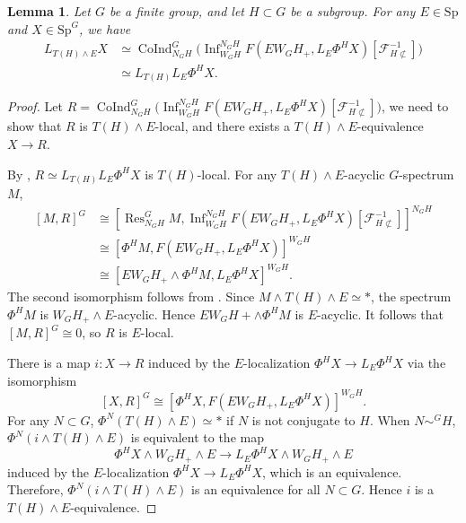 \documentclass{amsart}
\theoremstyle{plain}
\newtheorem{lemma}[theorem]{Lemma}
\theoremstyle{definition}
\theoremstyle{remark}
\begin{document}
\begin{lemma}\label{lem:morava k local}
    Let $G$ be a finite group, and let $H\subset G$ be a subgroup. For any $E\in \mathrm{Sp}$ and $X\in \mathrm{Sp}^G$, we have
    \[
    \begin{aligned}
        L_{T(H)\wedge E}X  & \simeq \operatorname{CoInd}_{N_GH}^G\bigl( \operatorname{Inf}_{W_G H}^{N_G H} F(EW_G H_+, L_{E}\Phi^H X)[\mathcal{F}_{H\not\subset}^{-1}] \bigr)\\
        & \simeq L_{T(H)}L_{E}\Phi^H X.
    \end{aligned}
    \]
\end{lemma}
\begin{proof}
    Let $R=\operatorname{CoInd}_{N_GH}^G\bigl( \operatorname{Inf}_{W_G H}^{N_G H} F(EW_G H_+, L_{E}\Phi^H X)[\mathcal{F}_{H\not\subset}^{-1}] \bigr)$, we need to show that $R$ is $T(H)\wedge E$-local, and there exists a $T(H)\wedge E$-equivalence $X\to R$. 

    By , $R\simeq L_{T(H)}L_{E}\Phi^H X$ is $T(H)$-local. For any $T(H)\wedge E$-acyclic $G$-spectrum $M$, 
    \[
    \begin{aligned}
        [M, R]^G &\cong [\operatorname{Res}_{N_G H}^G M, \operatorname{Inf}_{W_G H}^{N_G H} F(EW_G H_+, L_{E}\Phi^H X)[\mathcal{F}_{H\not\subset}^{-1}]]^{N_GH}\\
        & \cong [\Phi^H M, F(EW_G H_+, L_{E}\Phi^H X)]^{W_G H}\\
        & \cong [EW_G H_+ \wedge \Phi^H M, L_{E}\Phi^H X]^{W_G H}.
    \end{aligned}
    \]
    The second isomorphism follows from . Since $M\wedge T(H)\wedge E\simeq \ast$, the spectrum $\Phi^H M$ is $W_G H_+\wedge E$-acyclic. Hence $EW_G H+\wedge \Phi^H M$ is $E$-acyclic. It follows that $[M,R]^G\cong 0$, so $R$ is $E$-local.

    There is a map $i: X\to R$ induced by the $E$-localization $\Phi^H X\to L_E \Phi^H X$ via the isomorphism 
    \[
    [X,R]^G\cong [\Phi^H X, F(EW_G H_+, L_{E}\Phi^H X)]^{W_G H}. 
    \]
    For any $N\subset G$, $\Phi^N (T(H)\wedge E) \simeq \ast$ if $N$ is not conjugate to $H$. When $N\sim^G H$, $\Phi^N(i\wedge T(H)\wedge E)$ is equivalent to the map
    \[
    \Phi^H X\wedge W_GH_+ \wedge E \longrightarrow L_{E}\Phi^H X \wedge W_G H_+ \wedge E
    \]
    induced by the $E$-localization $\Phi^H X\to L_{E} \Phi^H X$, which is an equivalence. Therefore, $\Phi^N(i\wedge T(H)\wedge E)$ is an equivalence for all $N\subset G$. Hence $i$ is a $T(H)\wedge E$-equivalence.
\end{proof}
\end{document}
